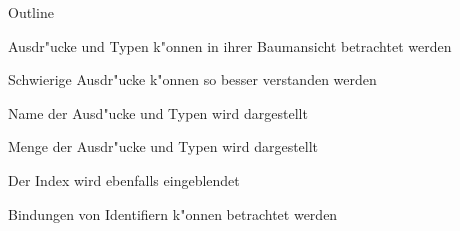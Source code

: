 {
  \begin{itemgroup}{Outline}
    \item Ausdr"ucke und Typen k"onnen in ihrer Baumansicht betrachtet werden
    \item Schwierige Ausdr"ucke k"onnen so besser verstanden werden
    \item Name der Ausd"ucke und Typen wird dargestellt
    \item Menge der Ausdr"ucke und Typen wird dargestellt
    \item Der Index wird ebenfalls eingeblendet
    \item Bindungen von Identifiern k"onnen betrachtet werden
  \end{itemgroup}
}